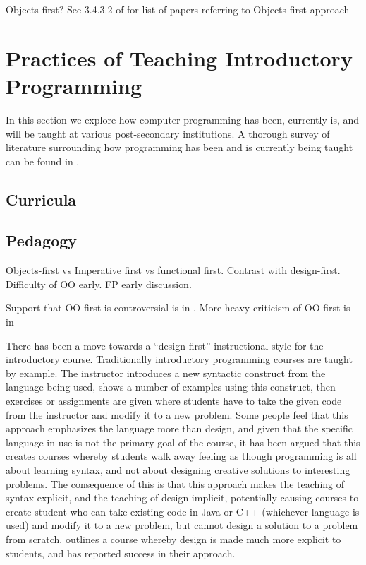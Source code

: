 Objects first?  See 3.4.3.2 of \cite{Pears07} for list of papers referring to Objects first approach

\section{Practices of Teaching Introductory Programming}

In this section we explore how computer programming has been, currently is, and will be taught at various post-secondary institutions.  A thorough survey of literature surrounding how programming has been and is currently being taught can be found in \cite{Pears07}.

\subsection{Curricula}

\subsection{Pedagogy}

Objects-first vs Imperative first vs functional first.  Contrast with design-first.  Difficulty of OO early.  FP early discussion.

Support that OO first is controversial is in \cite{Astrachan05}.  More heavy criticism of OO first is in \cite{Hu04}

There has been a move towards a ``design-first'' instructional style for the introductory course.  Traditionally introductory programming courses are taught by example.  The instructor introduces a new syntactic construct from the language being used, shows a number of examples using this construct, then exercises or assignments are given where students have to take the given code from the instructor and modify it to a new problem.  Some people feel that this approach emphasizes the language more than design, and given that the specific language in use is not the primary goal of the course, it has been argued that this creates courses whereby students walk away feeling as though programming is all about learning syntax, and not about designing creative solutions to interesting problems.  The consequence of this is that this approach makes the teaching of syntax explicit, and the teaching of design implicit, potentially causing courses to create student who can take existing code in Java or C++ (whichever language is used) and modify it to a new problem, but cannot design a solution to a problem from scratch.  \cite{Flatt04} outlines a course whereby design is made much more explicit to students, and has reported success in their approach.

